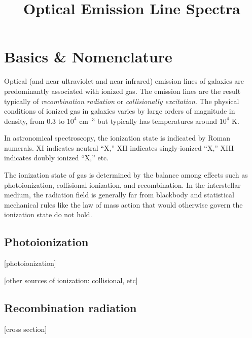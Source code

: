 \title{\bf Optical Emission Line Spectra}

\section{Basics \& Nomenclature}

Optical (and near ultraviolet and near infrared) emission lines of
galaxies are predominantly associated with ionized gas. The emission
lines are the result typically of {\it recombination radiation} or
{\it collisionally excitation}. The physical conditions of ionized gas
in galaxies varies by large orders of magnitude in density, from 0.3
to $10^4$ cm$^{-3}$ but typically has temperatures around $10^4$ K.

In astronomical spectroscopy, the ionization state is indicated by
Roman numerals. XI indicates neutral ``X,'' XII indicates
singly-ionized ``X,'' XIII indicates doubly ionized ``X,'' etc. 

The ionization state of gas is determined by the balance among effects
such as photoionization, collisional ionization, and recombination. In
the interstellar medium, the radiation field is generally far from
blackbody and statistical mechanical rules like the law of mass action
that would otherwise govern the ionization state do not hold.

\subsection{Photoionization}

[photoionization]

[other sources of ionization: collisional, etc]

\subsection{Recombination radiation}

[cross section]

